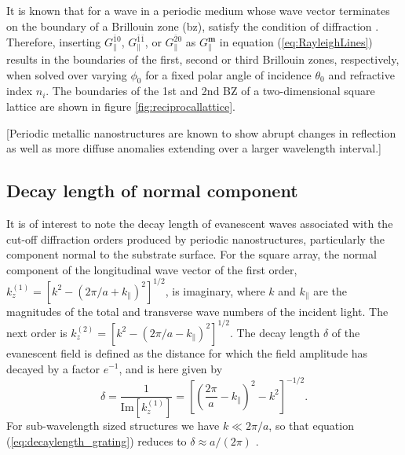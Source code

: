It is known that for a wave in a periodic medium whose wave vector terminates on the boundary of a Brillouin zone (\ac{bz}), satisfy the condition of diffraction .  Therefore, inserting $G_\parallel^{\bar{1}0}$, $G_\parallel^{\bar{1}\bar{1}}$, or $G_\parallel^{\bar{2}0}$ as $G_\parallel^{\mathbf{m}}$ in equation (\ref{eq:RayleighLines}) results in the boundaries of the first, second or third Brillouin zones, respectively, when solved over varying $\phi_0$ for a fixed polar angle of incidence $\theta_0$ and refractive index $n_i$. The boundaries of the 1st and 2nd BZ of a two-dimensional square lattice are shown in figure \ref{fig:reciprocallattice}.




[Periodic metallic nanostructures are known to show abrupt changes in reflection as well as more diffuse anomalies extending over a larger wavelength interval.]

\subsection{Decay length of normal component}
It is of interest to note the decay length of evanescent waves associated with the cut-off diffraction orders produced by periodic nanostructures, particularly the component normal to the substrate surface. For the square array, the normal component of the longitudinal wave vector of the first order, $k_z^{(1)}=[k^2-(2\pi/a+k_\parallel)^2]^{1/2}$, is imaginary, where $k$ and $k_\parallel$ are the magnitudes of the total and transverse wave numbers of the incident light. The next order is $k_z^{(2)}=[k^2-(2\pi/a-k_\parallel)^2]^{1/2}$. The decay length $\delta$ of the evanescent field is defined as the distance for which the field amplitude has decayed by a factor $e^{-1}$, and is here given by \cite{decaylength_comsolsupport}
\begin{equation}
    \delta = \frac{1}{\text{Im}[k_z^{(1)}]} = \left [ \left ( \frac{2\pi}{a} - k_\parallel \right )^2 - k^2 \right ] ^{-1/2}.
    \label{eq:decaylength_grating}
\end{equation}
For sub-wavelength sized structures we have $k\ll2\pi/a$, so that equation (\ref{eq:decaylength_grating}) reduces to $\delta\approx a/(2\pi)$ \cite{decaylength_comsolsupport}.

